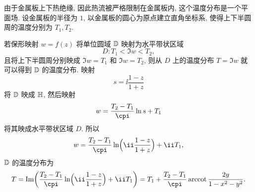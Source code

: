 \begin{solution}
  由于金属板上下热绝缘, 因此热流被严格限制在金属板内, 这个温度分布是一个平面场.
  设金属板的半径为 $1$, 以金属板的圆心为原点建立直角坐标系, 使得上下半圆周的温度分别为 $T_1,T_2$.

  若保形映射 $w=f(z)$ 将单位圆域 ${\mathbb{D}}$ 映射为水平带状区域 
  \[
    D:T_1<\Im w<T_2,
  \]
  且将上下半圆周分别映成 $\Im w=T_1$ 和 $\Im w=T_2$, 则从 $D$ 上的温度分布 $T=\Im w$ 就可以得到 ${\mathbb{D}}$ 的温度分布.
  映射
  \[
    s=\ii\dfrac{1-z}{1+z}
  \]
  将 ${\mathbb{D}}$ 映成 ${\mathbb{H}}$, 然后映射
  \[
    w=\dfrac{T_2-T_1}\cpi \ln s+T_1
  \]
  将其映成水平带状区域 $D$.
  所以
  \[
    w=\dfrac{T_2-T_1}\cpi \ln \Bigl(\ii\frac{1-z}{1+z}\Bigr)+\ii T_1,
  \]
  ${\mathbb{D}}$ 的温度分布为
  \[
    T=\Im\biggl(\dfrac{T_2-T_1}\cpi \ln \Bigl(\ii\frac{1-z}{1+z}\Bigr)+\ii T_1\biggr)
    =T_1+\frac{T_2-T_1}\cpi \arccot\frac{2y}{1-x^2-y^2}.
  \]
\end{solution}


\newpage
\startwidepage
{}

